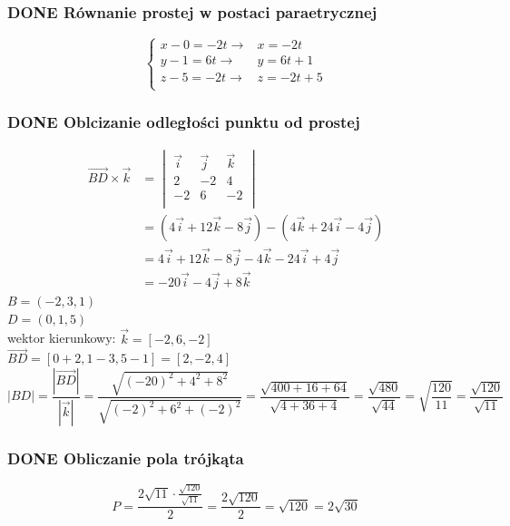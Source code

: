 \documentclass[11pt]{article}
\begin{document}
\subsubsection{{\bfseries\sffamily DONE} Równanie prostej w postaci paraetrycznej}
\label{sec:org60489dc}
\[\begin{cases}
x-0 = -2t \to & x = -2t\\
y - 1 = 6t \to & y = 6t +1\\
z -5 = -2t \to & z = -2t + 5\\
\end{cases}\]
\subsubsection{{\bfseries\sffamily DONE} Oblcizanie odległości punktu od prostej}
\label{sec:org368b0fe}
\begin{align*}
  \overrightarrow{BD} \times \vec{k}
  &= \begin{vmatrix}
       \vec{i} & \vec{j} & \vec{k}\\
       2 & -2 & 4\\
       -2 & 6 & -2\\
     \end{vmatrix}
  \\
  &= (4\vec{i} + 12\vec{k} - 8 \vec{j}) - (4 \vec{k} + 24 \vec{i} - 4 \vec{j})
  \\
  &= 4\vec{i} + 12\vec{k} - 8 \vec{j} - 4 \vec{k} - 24 \vec{i} + 4 \vec{j}
  \\
  &= -20\vec{i} - 4\vec{j} + 8 \vec{k}
\end{align*}
\(B=(-2,3,1)\)
\\\empty
\(D=(0, 1, 5)\)
\\\empty
wektor kierunkowy: \(\vec{k} = [-2, 6, -2]\)
\\\empty
\(\overrightarrow{BD} = [0 + 2 , 1 - 3 ,5 -1] = [2, -2, 4]\)
\\\empty
$$|BD| = \frac{|\overrightarrow{BD}|}{|\vec{k}|}
= \frac{\sqrt{(-20)^{2} + 4^{2} + 8^{2}}}
{\sqrt{(-2)^{2} + 6^{2} + (-2)^{2}} }
= \frac{\sqrt{400 + 16 + 64}}{\sqrt{4 + 36 + 4}}
= \frac{\sqrt{480}}{\sqrt{44}}
= \sqrt{\frac{120}{11}}
= \frac{\sqrt{120}}{\sqrt{11}}$$
\subsubsection{{\bfseries\sffamily DONE} Obliczanie pola trójkąta}
\label{sec:orgbe2776b}
$$P = \frac{ 2\sqrt{11} \cdot\frac{ \sqrt{120} }{\sqrt{11}} }
{2}
= \frac{2\sqrt{120}}{2}
= \sqrt{120}
= 2\sqrt{30}$$
\end{document}
